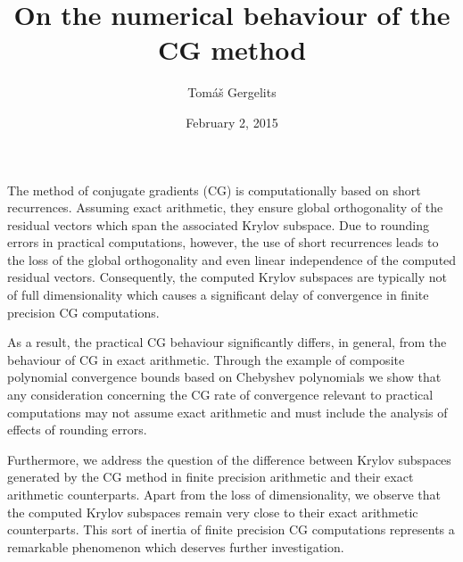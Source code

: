 \documentclass{article}
\title{On the numerical behaviour of the CG method}
\author{Tom{\'a}{\v s} Gergelits}
\affil{PhD student at Faculty of Mathematics and Physics, Charles University in Prague}
\date{February 2, 2015}
\begin{document}
\maketitle
The method of conjugate gradients (CG) is computationally based on short recurrences. Assuming exact arithmetic, they ensure global orthogonality of the residual vectors which span the associated Krylov subspace. Due to rounding errors in practical computations, however, the use of short recurrences leads to the loss of the global orthogonality and even linear independence of the computed residual vectors. Consequently, the computed Krylov subspaces are typically not of full dimensionality which causes a significant delay of convergence in finite precision CG computations.

As a result, the practical CG behaviour significantly differs, in general, from the behaviour of CG in exact arithmetic. Through the example of composite polynomial convergence bounds based on Chebyshev polynomials we show that any consideration concerning the CG rate of convergence relevant to practical computations may not assume exact arithmetic and must include the analysis of effects of rounding errors.

Furthermore, we address the question of the difference between Krylov subspaces generated by the CG method in finite precision arithmetic and their exact arithmetic counterparts. Apart from the loss of dimensionality, we observe that  the computed Krylov subspaces remain very close to their exact arithmetic counterparts. This sort of inertia of finite precision CG computations represents a remarkable phenomenon which deserves further investigation.
\end{document}
